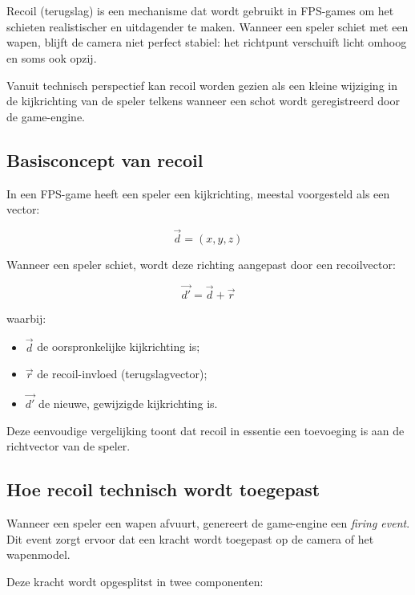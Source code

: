 \chapter{}
\label{ch:Recoil-binnen-FPS-games}

Recoil (terugslag) is een mechanisme dat wordt gebruikt in FPS-games om het schieten realistischer en uitdagender te maken. Wanneer een speler schiet met een wapen, blijft de camera niet perfect stabiel: het richtpunt verschuift licht omhoog en soms ook opzij.

Vanuit technisch perspectief kan recoil worden gezien als een kleine wijziging in de kijkrichting van de speler telkens wanneer een schot wordt geregistreerd door de game-engine.

\section{Basisconcept van recoil}

In een FPS-game heeft een speler een kijkrichting, meestal voorgesteld als een vector:

\[
\vec{d} = (x, y, z)
\]

Wanneer een speler schiet, wordt deze richting aangepast door een recoilvector:

\[
\vec{d'} = \vec{d} + \vec{r}
\]

waarbij:

\begin{itemize}
    \item $\vec{d}$ de oorspronkelijke kijkrichting is;
    \item $\vec{r}$ de recoil-invloed (terugslagvector);
    \item $\vec{d'}$ de nieuwe, gewijzigde kijkrichting is.
\end{itemize}

Deze eenvoudige vergelijking toont dat recoil in essentie een toevoeging is aan de richtvector van de speler.

\section{Hoe recoil technisch wordt toegepast}

Wanneer een speler een wapen afvuurt, genereert de game-engine een \textit{firing event}. Dit event zorgt ervoor dat een kracht wordt toegepast op de camera of het wapenmodel.

Deze kracht wordt opgesplitst in twee componenten:

